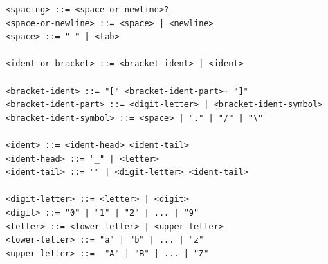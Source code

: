 \documentclass[titlepage]{article}
\begin{document}
\begin{lstlisting}
<spacing> ::= <space-or-newline>?
<space-or-newline> ::= <space> | <newline>
<space> ::= " " | <tab>

<ident-or-bracket> ::= <bracket-ident> | <ident>

<bracket-ident> ::= "[" <bracket-ident-part>+ "]"
<bracket-ident-part> ::= <digit-letter> | <bracket-ident-symbol>
<bracket-ident-symbol> ::= <space> | "." | "/" | "\"

<ident> ::= <ident-head> <ident-tail>
<ident-head> ::= "_" | <letter>
<ident-tail> ::= "" | <digit-letter> <ident-tail>

<digit-letter> ::= <letter> | <digit>
<digit> ::= "0" | "1" | "2" | ... | "9"
<letter> ::= <lower-letter> | <upper-letter>
<lower-letter> ::= "a" | "b" | ... | "z"
<upper-letter> ::=  "A" | "B" | ... | "Z"
\end{lstlisting}
\end{document}
